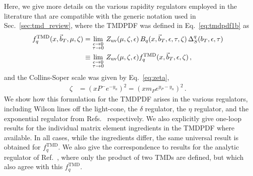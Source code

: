 \documentclass[11pt,a4paper]{article}
\DeclareRobustCommand{\eq}[1]{Eq.~\eqref{eq:#1}}
\DeclareRobustCommand{\sec}[1]{Sec.~\ref{sec:#1}}
\DeclareRobustCommand{\mycite}[1]{Ref.~\cite{#1}}
\DeclareRobustCommand{\mycites}[1]{Refs.~\cite{#1}}
\newcommand{\eps}{\epsilon}
\newcommand{\nn}{\nonumber}
\newcommand\TMD{\mathrm{TMD}}
\newcommand{\bt}{\vec b_T}
\begin{document}
Here, we give more details on the various rapidity regulators employed in the literature that are compatible with the generic notation used in \sec{tmd_review}, where the TMDPDF was defined in \eq{tmdpdf1b} as
\begin{align} \label{eq:tmdpdf_app}
 f^\TMD_q(x, \bt, \mu , \zeta) &
 = \lim_{ \substack{\epsilon\to 0 \\ \tau\to 0}}\, Z_{\rm uv}(\mu,\zeta,\eps) \, B_{q}(x, \bt, \eps, \tau, \zeta)\, \Delta_S^q(b_T,\eps,\tau)
\nn\\&
 \equiv \lim_{ \substack{\epsilon\to 0 \\ \tau\to 0}}\, Z_{\rm uv}(\mu,\zeta,\eps) f_q^{\TMD}(x, \bt, \epsilon, \zeta)
\,,\end{align}
and the Collins-Soper scale was given by \eq{zeta},
\begin{align} \label{eq:zetadefn_app}
 \zeta &= (x P^- e^{- y_n})^2  = (x m_P e^{y_P - y_n})^2
\,.\end{align}
We show how this formulation for the TMDPDF arises in the various regulators, 
including Wilson lines off the light-cone, the $\delta$ regulator, the $\eta$ regulator, and the exponential regulator from \mycites{Collins:1350496,GarciaEchevarria:2011rb,Chiu:2012ir,Li:2016axz} respectively.
We also explicitly give one-loop results for the individual matrix element ingredients in the TMDPDF where available. 
In all cases, while the ingredients differ, the same universal result is obtained for $f_q^{\TMD}$.  We also give the correspondence to  results for the analytic regulator of \mycite{Becher:2010tm}, where only the product of two TMDs are defined, but which also agree with this $f_q^\TMD$.
\end{document}
